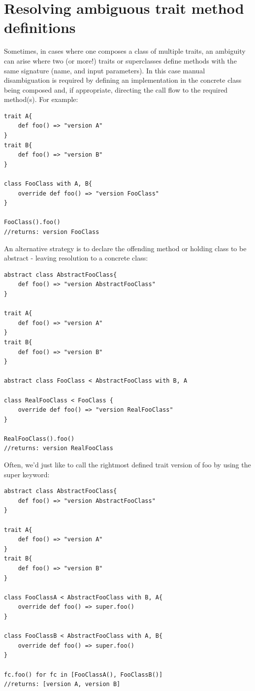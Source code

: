 \documentclass[conc-doc]{subfiles}
\begin{document}
\section{Resolving ambiguous trait method definitions}
Sometimes, in cases where one composes a class of multiple traits, an ambiguity can arise where two (or more!) traits or superclasses define methods with the same signature (name, and input parameters). In this case manual disambiguation is required by defining an implementation in the concrete class being composed and, if appropriate, directing the call flow to the required method(s). For example:
\begin{lstlisting}
trait A{
	def foo() => "version A"
}
trait B{
	def foo() => "version B"
}

class FooClass with A, B{
	override def foo() => "version FooClass"
}

FooClass().foo()
//returns: version FooClass
\end{lstlisting}

An alternative strategy is to declare the offending method or holding class to be abstract - leaving resolution to a concrete class:

\begin{lstlisting}
abstract class AbstractFooClass{
	def foo() => "version AbstractFooClass"
}

trait A{
	def foo() => "version A"
}
trait B{
	def foo() => "version B"
}

abstract class FooClass < AbstractFooClass with B, A

class RealFooClass < FooClass {
	override def foo() => "version RealFooClass"
}

RealFooClass().foo()
//returns: version RealFooClass
\end{lstlisting}

Often, we'd just like to call the rightmost defined trait version of foo by using the super keyword:
\begin{lstlisting}
abstract class AbstractFooClass{
	def foo() => "version AbstractFooClass"
}

trait A{
	def foo() => "version A"
}
trait B{
	def foo() => "version B"
}

class FooClassA < AbstractFooClass with B, A{
	override def foo() => super.foo()
}

class FooClassB < AbstractFooClass with A, B{
	override def foo() => super.foo()
}

fc.foo() for fc in [FooClassA(), FooClassB()]
//returns: [version A, version B]
\end{lstlisting}
\end{document}
